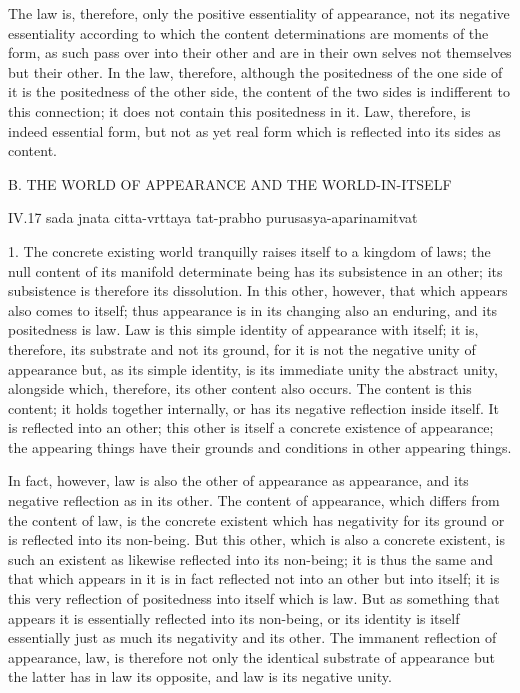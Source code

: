 The law is, therefore, only the positive essentiality of appearance,
not its negative essentiality according to which
the content determinations are moments of the form,
as such pass over into their other
and are in their own selves not themselves but their other.
In the law, therefore, although the positedness
of the one side of it is the positedness of the other side,
the content of the two sides is indifferent to this connection;
it does not contain this positedness in it.
Law, therefore, is indeed essential form,
but not as yet real form which is reflected into its sides as content.

B. THE WORLD OF APPEARANCE AND THE WORLD-IN-ITSELF

IV.17
sada jnata citta-vrttaya tat-prabho purusasya-aparinamitvat


1. The concrete existing world tranquilly raises itself to a kingdom of laws;
the null content of its manifold determinate being has its subsistence in
an other; its subsistence is therefore its dissolution. In this other, however,
that which appears also comes to itself; thus appearance is in its changing
also an enduring, and its positedness is law. Law is this simple identity of
appearance with itself; it is, therefore, its substrate and not its ground, for
it is not the negative unity of appearance but, as its simple identity, is its
immediate unity
the abstract unity, alongside which, therefore, its other
content also occurs. The content is this content; it holds together internally,
or has its negative reflection inside itself. It is reflected into an other; this
other is itself a concrete existence of appearance; the appearing things have
their grounds and conditions in other appearing things.

In fact, however, law is also the other of appearance as appearance, and its
negative reflection as in its other. The content of appearance, which differs
from the content of law, is the concrete existent which has negativity for
its ground or is reflected into its non-being. But this other, which is also a
concrete existent, is such an existent as likewise reflected into its non-being;
it is thus the same and that which appears in it is in fact reflected not into
an other but into itself; it is this very reflection of positedness into itself
which is law. But as something that appears it is essentially reflected into its
non-being, or its identity is itself essentially just as much its negativity and
its other. The immanent reflection of appearance, law, is therefore not only
the identical substrate of appearance but the latter has in law its opposite,
and law is its negative unity.

